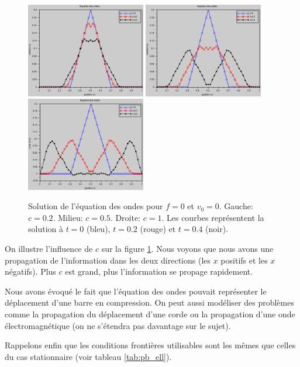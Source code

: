 \documentclass[12pt,a4paper,twoside]{article}
\begin{document}
\begin{figure}[h]
  \centering
  \includegraphics[width = 5.2cm]{Figures/ondes_c0_2.eps}
  \includegraphics[width = 5.2cm]{Figures/ondes_c0_5.eps}
  \includegraphics[width = 5.2cm]{Figures/ondes_c1.eps}
  \caption{Solution de l'\'equation des ondes pour $f=0$ et $v_0 = 0$.
  Gauche: $c = 0.2$. Milieu: $c=0.5$. Droite: $c=1$.
  Les courbes repr\'esentent la solution \`a $t=0$ (bleu),
  $t=0.2$ (rouge) et $t=0.4$ (noir).}
  \label{fig:ondes_c}
\end{figure}


On illustre l'influence de $c$ sur la figure \ref{fig:ondes_c}.
Nous voyons que nous avons une propagation de l'information 
dans les deux directions (les $x$ positifs et les $x$ n\'egatifs).
Plus $c$ est grand, plus l'information se propage rapidement.


Nous avons \'evoqu\'e le fait que l'\'equation des ondes
pouvait repr\'esenter le d\'eplacement d'une barre en compression.
On peut aussi mod\'eliser des probl\`emes 
comme la propagation du d\'eplacement d'une corde ou
la propagation d'une onde \'electromagn\'etique
(on ne s'\'etendra pas davantage sur le sujet).


Rappelons enfin que les conditions fronti\`eres utilisables sont 
les m\^emes que celles du cas stationnaire
(voir tableau \ref{tab:pb_ell}).
\end{document}

